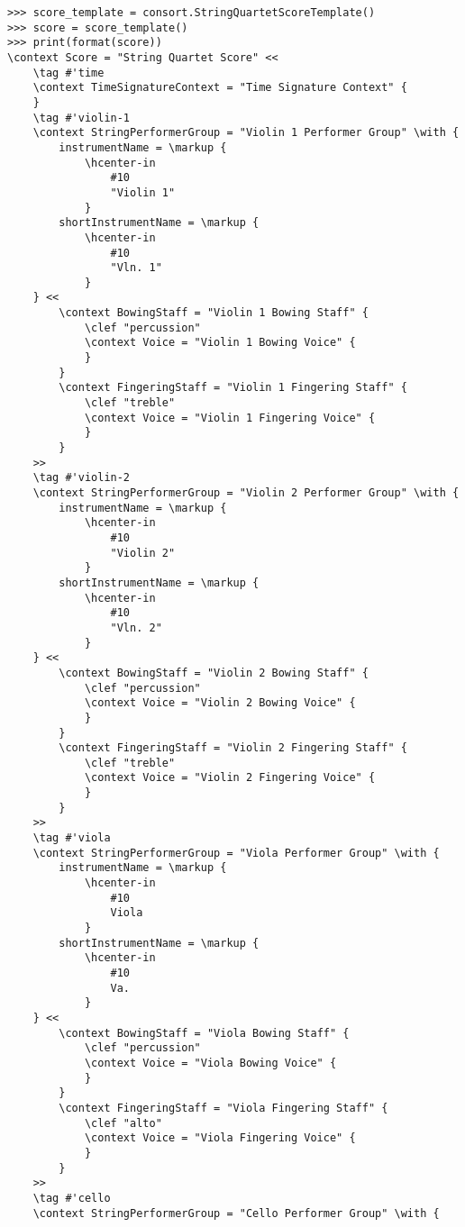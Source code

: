 \begin{abjadbookoutput}
\begin{singlespacing}
\vspace{-0.5\baselineskip}
\begin{verbatim}
>>> score_template = consort.StringQuartetScoreTemplate()
>>> score = score_template()
>>> print(format(score))
\context Score = "String Quartet Score" <<
    \tag #'time
    \context TimeSignatureContext = "Time Signature Context" {
    }
    \tag #'violin-1
    \context StringPerformerGroup = "Violin 1 Performer Group" \with {
        instrumentName = \markup {
            \hcenter-in
                #10
                "Violin 1"
            }
        shortInstrumentName = \markup {
            \hcenter-in
                #10
                "Vln. 1"
            }
    } <<
        \context BowingStaff = "Violin 1 Bowing Staff" {
            \clef "percussion"
            \context Voice = "Violin 1 Bowing Voice" {
            }
        }
        \context FingeringStaff = "Violin 1 Fingering Staff" {
            \clef "treble"
            \context Voice = "Violin 1 Fingering Voice" {
            }
        }
    >>
    \tag #'violin-2
    \context StringPerformerGroup = "Violin 2 Performer Group" \with {
        instrumentName = \markup {
            \hcenter-in
                #10
                "Violin 2"
            }
        shortInstrumentName = \markup {
            \hcenter-in
                #10
                "Vln. 2"
            }
    } <<
        \context BowingStaff = "Violin 2 Bowing Staff" {
            \clef "percussion"
            \context Voice = "Violin 2 Bowing Voice" {
            }
        }
        \context FingeringStaff = "Violin 2 Fingering Staff" {
            \clef "treble"
            \context Voice = "Violin 2 Fingering Voice" {
            }
        }
    >>
    \tag #'viola
    \context StringPerformerGroup = "Viola Performer Group" \with {
        instrumentName = \markup {
            \hcenter-in
                #10
                Viola
            }
        shortInstrumentName = \markup {
            \hcenter-in
                #10
                Va.
            }
    } <<
        \context BowingStaff = "Viola Bowing Staff" {
            \clef "percussion"
            \context Voice = "Viola Bowing Voice" {
            }
        }
        \context FingeringStaff = "Viola Fingering Staff" {
            \clef "alto"
            \context Voice = "Viola Fingering Voice" {
            }
        }
    >>
    \tag #'cello
    \context StringPerformerGroup = "Cello Performer Group" \with {

\end{verbatim}
\end{singlespacing}
\end{abjadbookoutput}
